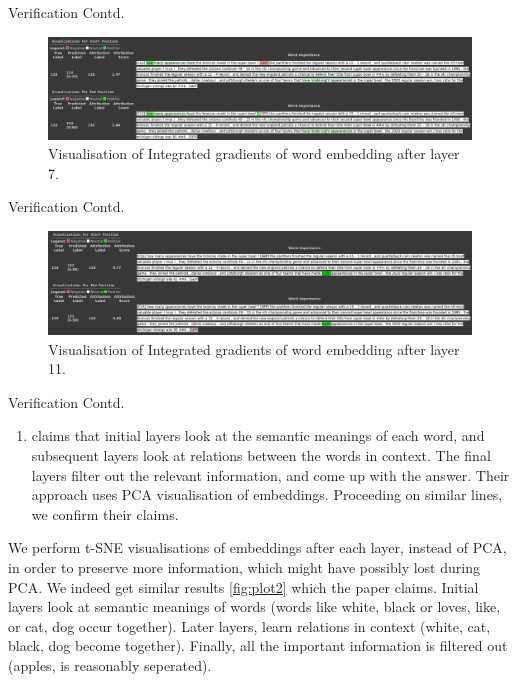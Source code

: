 \documentclass[10pt]{beamer}
\begin{document}
\begin{frame}{Verification Contd.}
\begin{figure}
    \includegraphics[width=\linewidth]{ll5.png}
    \caption{Visualisation of Integrated gradients of word embedding after layer 7.}
\end{figure}
\end{frame}

\begin{frame}{Verification Contd.}
\begin{figure}
    \includegraphics[width=\linewidth]{ll11.png}
    \caption{Visualisation of Integrated gradients of word embedding after layer 11.}
\end{figure}
\end{frame}
\begin{frame}{Verification Contd.}

\begin{enumerate}[2]
    \item \cite{bert_layers_qa} claims that initial layers look at the semantic meanings of each word, and subsequent layers look at relations between the words in context. The final layers filter out the relevant information, and come up with the answer. Their approach uses PCA visualisation of embeddings.  Proceeding on similar lines, we confirm their claims.
\end{enumerate}
We perform t-SNE visualisations of embeddings after each layer, instead of PCA, in order to preserve more information, which might have possibly lost during PCA. We indeed get similar results \ref{fig:plot2} which the paper claims. Initial layers look at semantic meanings of words (words like white, black or loves, like, or cat, dog occur together). Later layers, learn relations in context (white, cat, black, dog become together). Finally, all the important information is filtered out (apples, is reasonably seperated).
\end{frame}
\end{document}
